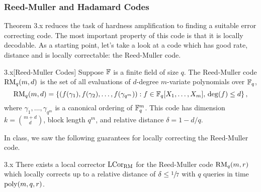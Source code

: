 \documentclass[11pt]{article}
\begin{document}
\subsubsection{Reed-Muller and Hadamard Codes}

Theorem 3.x reduces the task of hardness amplification to finding a suitable error correcting code. The most important property of this code is that it is locally decodable. As a starting point, let's take a look at a code which has good rate, distance and is locally correctable: the Reed-Muller code.

\begin{definition}{3.x}[Reed-Muller Codes]
    Suppose $\mathbb{F}$ is a finite field of size $q$. The Reed-Muller code $\mathrm{RM}_q(m, d)$ is the set of all evaluations of $d$-degree $m$-variate polynomials over $\mathbb{F}_q$,
    \begin{equation*}
        \mathrm{RM}_q(m ,d) = \left\{(f(\gamma_1), f(\gamma_2), \ldots, f(\gamma_{q^m})) : f \in \mathbb{F}_q[X_1, \ldots, X_m], \, \deg (f) \leq d\right\},
    \end{equation*}
    where $\gamma_1, \ldots, \gamma_{q^m}$ is a canonical ordering of $\mathbb{F}_q^m$. This code has dimension $k = \binom{m + d}{d}$, block length $q^m$, and relative distance $\delta = 1 - d/ q$.
\end{definition}

In class, we saw the following guarantees for locally correcting the Reed-Muller code.

\begin{claim}{3.x}
    There exists a local corrector ${\textup{LCor}}_{\mathrm{RM}}$ for the Reed-Muller code $\mathrm{RM}_q(m, r)$ which locally corrects up to a relative distance of $\delta \leq \sfrac{1}{7}$ with $q$ queries in time $\mathrm{poly}(m, q, r)$.
\end{claim}
\end{document}
